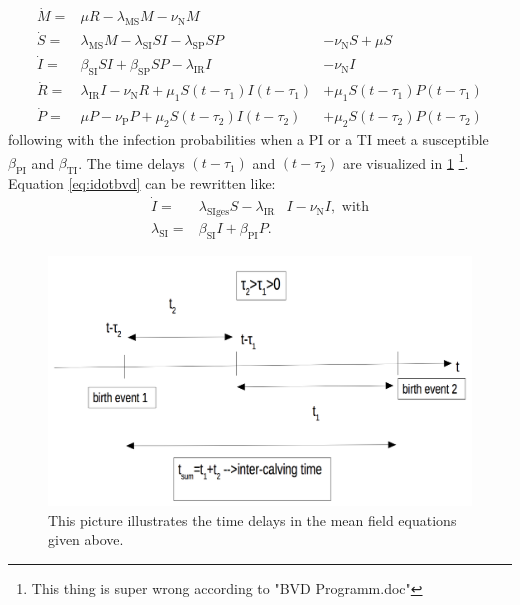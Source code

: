 \begin{eqnarray}
\dot{M}  =& \mu R-\lambda_\text{MS} M -\nu_\text{N} M & \\
\dot{S}  =& \lambda_\text{MS} M - \lambda_\text{SI}SI-\lambda_\text{SP} SP &-\nu_\text{N} S + \mu S \\
\dot{I}  =& \beta_\text{SI}SI+\beta_\text{SP} SP - \lambda_\text{IR} I &- \nu_\text{N} I \label{eq:idotbvd} \\
\dot{R}  =& \lambda_\text{IR}I - \nu_\text{N} R +\mu_1S(t-\tau_1)I(t-\tau_1) &+\mu_1S(t-\tau_1)P(t-\tau_1) \\ 
\dot{P}  =&  \mu P -\nu_\text{P}P + \mu_2S(t-\tau_2)I(t-\tau_2) &+ \mu_2S(t-\tau_2)P(t-\tau_2)
\end{eqnarray}
following \citep{BAS16} with the infection probabilities when a PI or a TI meet a susceptible $\beta_\text{PI}$ and $\beta_\text{TI}$. The time delays $(t-\tau_1)$ and $(t-\tau_2)$ are visualized in \ref{fig:infectionTimeScale} 
\footnote{This thing is super wrong according to "BVD Programm.doc"}. Equation \ref{eq:idotbvd} can be rewritten like:
\begin{eqnarray}
\dot{I}  =& \lambda_\text{SIges}S - \lambda_\text{IR}&I - \nu_\text{N} I, \text{ with} \\
\lambda_\text{SI} =& \beta_\text{SI} I+ \beta_\text{PI} P.& \label{eq:vie04start}
\end{eqnarray}

\begin{figure}[htbp]
\centering
\noindent\includegraphics[width=\linewidth,height=\textheight,
keepaspectratio]{infectionTimeScale.png} \caption[Visualization of time delays in the mean field model]{This picture illustrates the time delays in the mean field equations given above.}
\label{fig:infectionTimeScale}
\end{figure}
